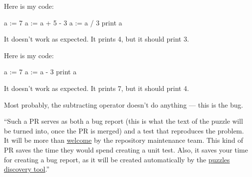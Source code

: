 \documentclass{article}
\begin{document}

\begin{pptWide}{2}
{\small\begin{ffcode}
Here is my code:

a := 7
a := a + 5 - 3
a := a / 3
print a

It doesn't work as expected.
It prints 4, but it should
print 3.
\end{ffcode}
}
\par\columnbreak\par
{\small\begin{ffcode}
Here is my code:

a := 7
a := a - 3
print a

It doesn't work as expected.
It prints 7, but it should
print 4.
\end{ffcode}
}
Most probably, the subtracting operator doesn't do anything --- this is the bug.
\end{pptWide}
\plush{}




\begin{pptWide}{2}
{\small{}
}
\par\columnbreak\par
``Such a PR serves as both a bug report (this is what the text of the puzzle will be turned into, once the PR is merged) and a test that reproduces the problem. It will be more than \ul{welcome} by the repository maintenance team. This kind of PR saves the time they would spend creating a unit test. Also, it saves your time for creating a bug report, as it will be created automatically by the \ul{puzzles discovery tool}.''~\citep{bugayenko2023blog0725}
\end{pptWide}
\plush{}
\end{document}
